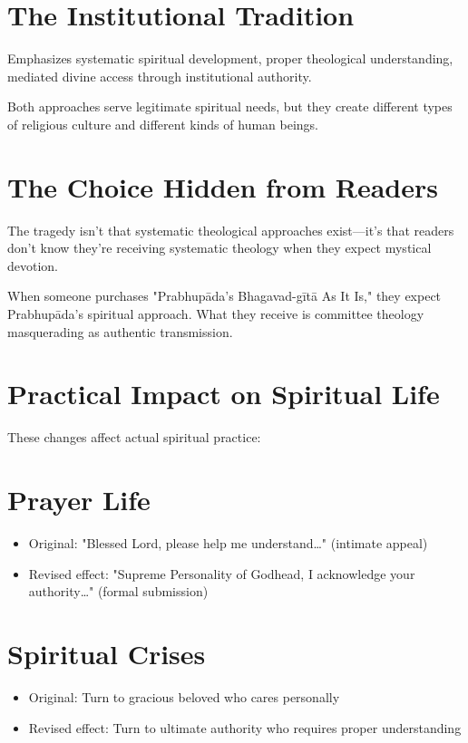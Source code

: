 \documentclass[11pt,twoside]{book}
\begin{document}
\section*{The Institutional Tradition}
\label{sec:org836c144}
Emphasizes systematic spiritual development, proper theological understanding, mediated divine access through institutional authority.

Both approaches serve legitimate spiritual needs, but they create different types of religious culture and different kinds of human beings.
\section*{The Choice Hidden from Readers}
\label{sec:org0cfa3e7}

The tragedy isn't that systematic theological approaches exist—it's that readers don't know they're receiving systematic theology when they expect mystical devotion.

When someone purchases "Prabhupāda's Bhagavad-gītā As It Is," they expect Prabhupāda's spiritual approach. What they receive is committee theology masquerading as authentic transmission.
\section*{Practical Impact on Spiritual Life}
\label{sec:org6032c16}

These changes affect actual spiritual practice:
\section*{Prayer Life}
\label{sec:org5e5f527}
\begin{itemize}
\item Original: "Blessed Lord, please help me understand\ldots{}" (intimate appeal)
\item Revised effect: "Supreme Personality of Godhead, I acknowledge your authority\ldots{}" (formal submission)
\end{itemize}
\section*{Spiritual Crises}
\label{sec:org4eb13ed}
\begin{itemize}
\item Original: Turn to gracious beloved who cares personally
\item Revised effect: Turn to ultimate authority who requires proper understanding
\end{itemize}
\end{document}
